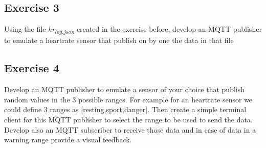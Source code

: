 \documentclass{article}
\begin{document}
\subsection{Exercise 3}
\label{exercise-3}
Using the file \emph{hr\textsubscript{log.json}} created in the exercise before, develop an
MQTT publisher to emulate a heartrate sensor that publish on by one the
data in that file

\subsection{Exercise 4}
\label{exercise-4}
Develop an MQTT publisher to emulate a sensor of your choice that
publish random values in the 3 possible ranges. For example for an
heartrate sensor we could define 3 ranges as [resting,sport,danger].
Then create a simple terminal client for this MQTT publisher to select
the range to be used to send the data. Develop also an MQTT subscriber
to receive those data and in case of data in a warning range provide a
visual feedback.
\end{document}
